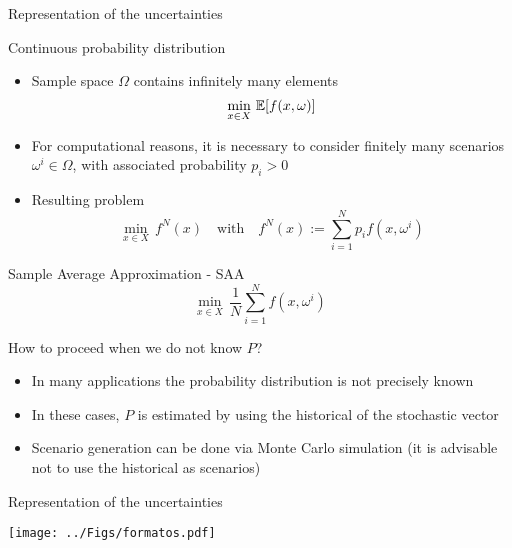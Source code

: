 \begin{frame}{Representation of the uncertainties}
\begin{block}{Continuous probability distribution}
\begin{itemize}
\item Sample space  $\Omega$ contains infinitely many elements
\[
\min_{x \in X}\, \mathbb{E}[f(x,\omega)]
\]

\item  For computational reasons, it is necessary to  consider finitely many scenarios $\omega^i \in \Omega$, with associated probability $p_i>0$
\pula

\item Resulting problem
\[
\min_{x \in X}\, f^N(x)\quad \mbox{with}\quad f^N(x):=\sum_{i=1}^{N}p_if(x,\omega^i)
\]
\end{itemize}
\end{block}
\begin{block}{Sample Average Approximation - SAA}
\[
\min_{x \in X}\, \frac{1}{N}\sum_{i=1}^{N}f(x,\omega^i)
\]
\end{block}
 \end{frame}



\begin{frame}
\begin{block}{How to proceed when we do not know $P$?}
\begin{itemize}
\item In many applications the probability distribution is not precisely known
\pula

\item In these cases, $ P $ is estimated by using the historical of the stochastic vector
\pula

\item Scenario generation can be done via Monte Carlo simulation (it is advisable not to use
the historical as scenarios)
\end{itemize}
\pula
\end{block}
\begin{block}{Representation of the uncertainties}
\begin{center}
\texttt{[image: ../Figs/formatos.pdf]} {}
\end{center}
\end{block}
\end{frame}






